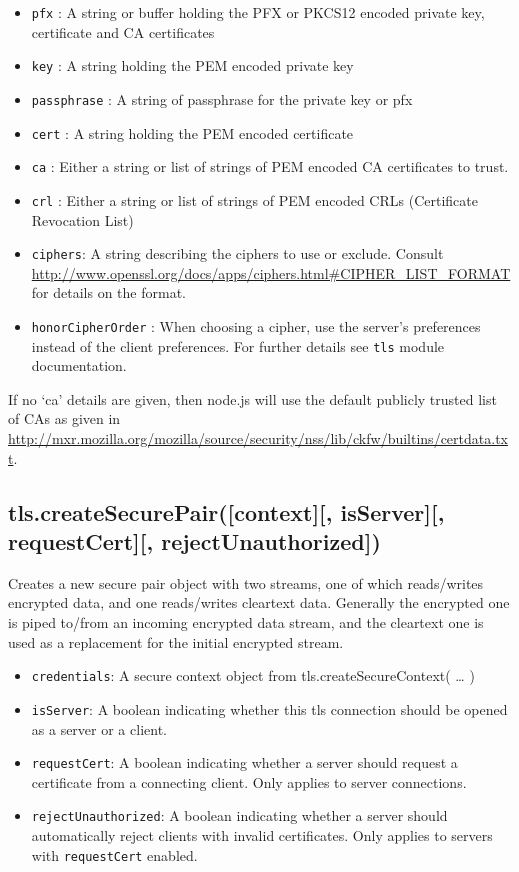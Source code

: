 \begin{itemize}
\itemsep1pt\parskip0pt
\item
  \texttt{pfx} : A string or buffer holding the PFX or PKCS12 encoded
  private key, certificate and CA certificates
\item
  \texttt{key} : A string holding the PEM encoded private key
\item
  \texttt{passphrase} : A string of passphrase for the private key or
  pfx
\item
  \texttt{cert} : A string holding the PEM encoded certificate
\item
  \texttt{ca} : Either a string or list of strings of PEM encoded CA
  certificates to trust.
\item
  \texttt{crl} : Either a string or list of strings of PEM encoded CRLs
  (Certificate Revocation List)
\item
  \texttt{ciphers}: A string describing the ciphers to use or exclude.
  Consult
  \url{http://www.openssl.org/docs/apps/ciphers.html\#CIPHER_LIST_FORMAT}
  for details on the format.
\item
  \texttt{honorCipherOrder} : When choosing a cipher, use the server's
  preferences instead of the client preferences. For further details see
  \texttt{tls} module documentation.
\end{itemize}

If no `ca' details are given, then node.js will use the default publicly
trusted list of CAs as given in
\url{http://mxr.mozilla.org/mozilla/source/security/nss/lib/ckfw/builtins/certdata.txt}.

\subsection{tls.createSecurePair({[}context{]}{[}, isServer{]}{[},
requestCert{]}{[},
rejectUnauthorized{]})}\label{tls.createsecurepaircontext-isserver-requestcert-rejectunauthorized}

Creates a new secure pair object with two streams, one of which
reads/writes encrypted data, and one reads/writes cleartext data.
Generally the encrypted one is piped to/from an incoming encrypted data
stream, and the cleartext one is used as a replacement for the initial
encrypted stream.

\begin{itemize}
\item
  \texttt{credentials}: A secure context object from
  tls.createSecureContext( \ldots{} )
\item
  \texttt{isServer}: A boolean indicating whether this tls connection
  should be opened as a server or a client.
\item
  \texttt{requestCert}: A boolean indicating whether a server should
  request a certificate from a connecting client. Only applies to server
  connections.
\item
  \texttt{rejectUnauthorized}: A boolean indicating whether a server
  should automatically reject clients with invalid certificates. Only
  applies to servers with \texttt{requestCert} enabled.
\end{itemize}

